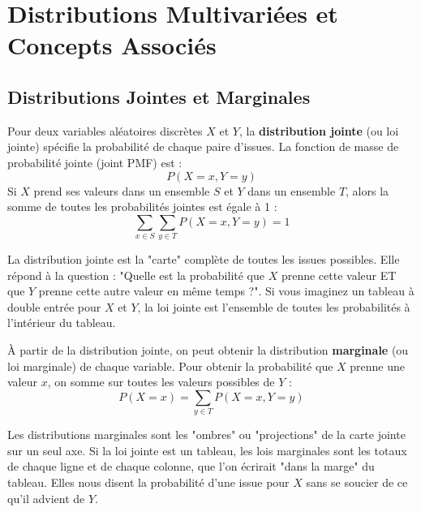 \newpage
\section{Distributions Multivariées et Concepts Associés}

\subsection{Distributions Jointes et Marginales}

\begin{definitionbox}
Pour deux variables aléatoires discrètes $X$ et $Y$, la \textbf{distribution jointe} (ou loi jointe) spécifie la probabilité de chaque paire d'issues. La fonction de masse de probabilité jointe (joint PMF) est :
$$ P(X=x, Y=y) $$
Si $X$ prend ses valeurs dans un ensemble $S$ et $Y$ dans un ensemble $T$, alors la somme de toutes les probabilités jointes est égale à 1 :
$$ \sum_{x \in S} \sum_{y \in T} P(X=x, Y=y) = 1 $$
\end{definitionbox}

\begin{intuitionbox}
La distribution jointe est la "carte" complète de toutes les issues possibles. Elle répond à la question : "Quelle est la probabilité que $X$ prenne cette valeur ET que $Y$ prenne cette autre valeur en même temps ?". Si vous imaginez un tableau à double entrée pour $X$ et $Y$, la loi jointe est l'ensemble de toutes les probabilités à l'intérieur du tableau.
\end{intuitionbox}

\begin{definitionbox}
À partir de la distribution jointe, on peut obtenir la distribution \textbf{marginale} (ou loi marginale) de chaque variable. Pour obtenir la probabilité que $X$ prenne une valeur $x$, on somme sur toutes les valeurs possibles de $Y$ :
$$ P(X=x) = \sum_{y \in T} P(X=x, Y=y) $$
\end{definitionbox}

\begin{intuitionbox}
Les distributions marginales sont les "ombres" ou "projections" de la carte jointe sur un seul axe. Si la loi jointe est un tableau, les lois marginales sont les totaux de chaque ligne et de chaque colonne, que l'on écrirait "dans la marge" du tableau. Elles nous disent la probabilité d'une issue pour $X$ sans se soucier de ce qu'il advient de $Y$.
\end{intuitionbox}

